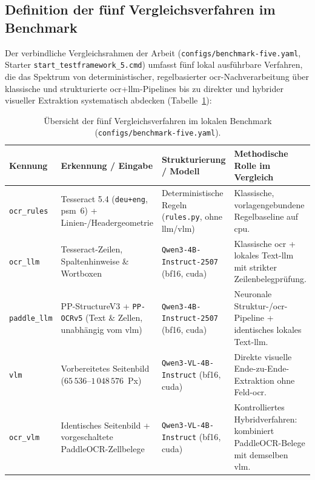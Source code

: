 \subsection{Definition der fünf Vergleichsverfahren im Benchmark}
\label{subsec:sechs-hauptverfahren}

Der verbindliche Vergleichsrahmen der Arbeit (\texttt{configs/benchmark-five.yaml}, Starter \texttt{start\_testframework\_5.cmd}) umfasst fünf lokal ausführbare Verfahren, die das Spektrum von deterministischer, regelbasierter \ac{ocr}-Nachverarbeitung über klassische und strukturierte \ac{ocr}+\ac{llm}-Pipelines bis zu direkter und hybrider visueller Extraktion systematisch abdecken (Tabelle~\ref{tab:hauptverfahren}):

\begin{table}[htbp]
  \centering
  \caption[Übersicht der fünf Vergleichsverfahren im lokalen Benchmark]{Übersicht der fünf Vergleichsverfahren im lokalen Benchmark (\texttt{configs/benchmark-five.yaml}).}
  \label{tab:hauptverfahren}
  \footnotesize
  \begin{tabularx}{\textwidth}{@{}>{\raggedright\arraybackslash}p{} >{\raggedright\arraybackslash}p{} >{\raggedright\arraybackslash}p{} >{\raggedright\arraybackslash}X@{}}
    \toprule
    \textbf{Kennung} & \textbf{Erkennung / Eingabe} & \textbf{Strukturierung / Modell} & \textbf{Methodische Rolle im Vergleich} \\
    \midrule
    \texttt{ocr\_rules} & Tesseract 5.4 (\texttt{deu+eng}, \ac{psm}~6) + Linien-/Headergeometrie & Deterministische Regeln (\texttt{rules.py}, ohne \ac{llm}/\ac{vlm}) & Klassische, vorlagengebundene Regelbaseline auf \acs{cpu}. \\
    \addlinespace[3pt]
    \texttt{ocr\_llm} & Tesseract-Zeilen, Spaltenhinweise \& Wortboxen & \texttt{Qwen3-4B-Instruct-2507} (\acs{bf16}, \acs{cuda}) & Klassische \ac{ocr} + lokales Text-\ac{llm} mit strikter Zeilenbelegprüfung. \\
    \addlinespace[3pt]
    \texttt{paddle\_llm} & PP-StructureV3 + \texttt{PP-OCRv5} (Text \& Zellen, unabhängig vom \ac{vlm}) & \texttt{Qwen3-4B-Instruct-2507} (\acs{bf16}, \acs{cuda}) & Neuronale Struktur-/\ac{ocr}-Pipeline + identisches lokales Text-\ac{llm}. \\
    \addlinespace[3pt]
    \texttt{vlm} & Vorbereitetes Seitenbild ($65\,536$–$1\,048\,576$~Px) & \texttt{Qwen3-VL-4B-Instruct} (\acs{bf16}, \acs{cuda}) & Direkte visuelle Ende-zu-Ende-Extraktion ohne Feld-\ac{ocr}. \\
    \addlinespace[3pt]
    \texttt{ocr\_vlm} & Identisches Seitenbild + vorgeschaltete PaddleOCR-Zellbelege & \texttt{Qwen3-VL-4B-Instruct} (\acs{bf16}, \acs{cuda}) & Kontrolliertes Hybridverfahren: kombiniert PaddleOCR-Belege mit demselben \ac{vlm}. \\
    \bottomrule
  \end{tabularx}
\end{table}

